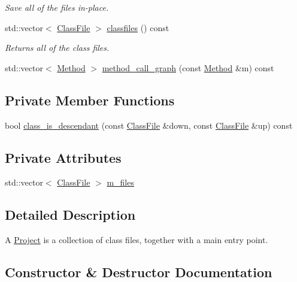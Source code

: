 \begin{DoxyCompactItemize}
\begin{DoxyCompactList}\small\item\em Save all of the files in-\/place. \end{DoxyCompactList}\item 
std\+::vector$<$ \hyperlink{classfile_8h_a00b46b60bc40e813e9fb1bb049174346}{Class\+File} $>$ \hyperlink{classProject_a74b0dfe1d19f11e859489922a8d277c7}{classfiles} () const
\begin{DoxyCompactList}\small\item\em Returns all of the class files. \end{DoxyCompactList}\item 
std\+::vector$<$ \hyperlink{classMethod}{Method} $>$ \hyperlink{classProject_ac4d866eaedfd1083d4736530382c7b7c}{method\+\_\+call\+\_\+graph} (const \hyperlink{classMethod}{Method} \&m) const
\end{DoxyCompactItemize}
\subsection*{Private Member Functions}
\begin{DoxyCompactItemize}
\item 
bool \hyperlink{classProject_a6ef93527bbe86e9bdfbc6d624eab0834}{class\+\_\+is\+\_\+descendant} (const \hyperlink{classfile_8h_a00b46b60bc40e813e9fb1bb049174346}{Class\+File} \&down, const \hyperlink{classfile_8h_a00b46b60bc40e813e9fb1bb049174346}{Class\+File} \&up) const
\end{DoxyCompactItemize}
\subsection*{Private Attributes}
\begin{DoxyCompactItemize}
\item 
std\+::vector$<$ \hyperlink{classfile_8h_a00b46b60bc40e813e9fb1bb049174346}{Class\+File} $>$ \hyperlink{classProject_a33de2bfb90183333d5e7c422bc5d6396}{m\+\_\+files}
\end{DoxyCompactItemize}


\subsection{Detailed Description}
A \hyperlink{classProject}{Project} is a collection of class files, together with a main entry point. 

\subsection{Constructor \& Destructor Documentation}
\mbox{\label{classProject_aa263ab552c113e7a9db9e90c3dac0879}} 
